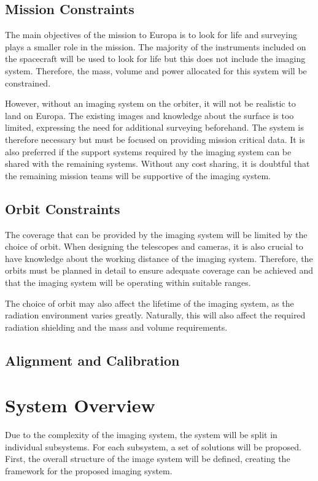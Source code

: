 \subsection{Mission Constraints}
The main objectives of the mission to Europa is to look for life and surveying plays a smaller role in the mission. The majority of the instruments included on the spacecraft will be used to look for life but this does not include the imaging system. Therefore, the mass, volume and power allocated for this system will be constrained.

However, without an imaging system on the orbiter, it will not be realistic to land on Europa. The existing images and knowledge about the surface is too limited, expressing the need for additional surveying beforehand. The system is therefore necessary but must be focused on providing mission critical data. It is also preferred if the support systems required by the imaging system can be shared with the remaining systems. Without any cost sharing, it is doubtful that the remaining mission teams will be supportive of the imaging system.
\subsection{Orbit Constraints}
The coverage that can be provided by the imaging system will be limited by the choice of orbit. When designing the telescopes and cameras, it is also crucial to have knowledge about the working distance of the imaging system. Therefore, the orbits must be planned in detail to ensure adequate coverage can be achieved and that the imaging system will be operating within suitable ranges.

The choice of orbit may also affect the lifetime of the imaging system, as the radiation environment varies greatly. Naturally, this will also affect the required radiation shielding and the mass and volume requirements.
\subsection{Alignment and Calibration}
\newpage
\section{System Overview}
Due to the complexity of the imaging system, the system will be split in individual subsystems. For each subsystem, a set of solutions will be proposed. First, the overall structure of the image system will be defined, creating the framework for the proposed imaging system.

